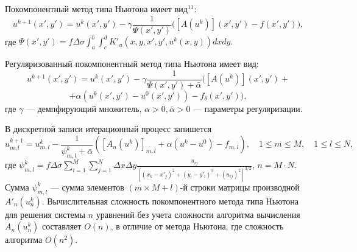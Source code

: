 \documentclass[%
autoref,     %
href,        %
facsimile,   %
colorlinks,  %
]{disser}
\begin{document}

Покомпонентный метод типа Ньютона имеет вид$^{11}$:
$$u^{k+1}(x',y')=u^k(x',y')-\gamma\frac{1}{\varPsi(x',y')}\big([A(u^k)](x',y')-f(x',y')\big),$$
где $\varPsi(x',y')=f\Delta\sigma\int_{a}^{b}\int_{c}^{d}K'_u(x,y, x',y',u^k(x,y)) dxdy.$

Регуляризованный покомпонентный метод типа Ньютона имеет вид:
$$u^{k+1}(x',y')=u^k(x',y')-\gamma\frac{1}{\varPsi(x',y')+\bar{\alpha}}([A(u^k)](x',y')+$$ 
$$+\alpha (u^k(x',y')-u^0(x',y'))-f_\delta(x',y')),$$
где $\gamma$ --- демпфирующий множитель, $\alpha>0, \bar{\alpha} >0$ --- параметры регуляризации.

В дискретной записи итерационный процесс запишется
$$u_{m,l}^{k+1}=u_{m,l}^k-\frac{1}{\psi_{m,l}^k+\bar\alpha}([A_n(u^k)]_{m,l} + \alpha(u^k-u^0) -f_{m,l}),\quad 1\le m \le M, \quad 1\le l \le N,$$
{\scriptsize
	\let\thefootnote\relax\let\thefootnote\relax{}
}
где $\psi_{m,l}^k=f\Delta\sigma\sum\limits_{i=1}^{M}\sum\limits_{j=1}^{N}
\Delta x\Delta y\frac{u_{ij}}{[(x_k-x'_j)^2+(y_l-y'_i)^2+(u_{ij})^2]^{3/2}}$, $n=M\cdot N$.
Сумма $\psi_{m,l}^k$ --- сумма элементов $(m\times M + l)$-й строки матрицы производной $A'_n(u_n^k)$.
Вычислительная сложность покомпонентного метода типа Ньютона для решения системы $n$ уравнений без учета сложности алгоритма вычисления $A_n(u_n^k)$ составляет $O(n)$, в отличие от метода Ньютона, где сложность алгоритма $O(n^2)$.
\end{document}
